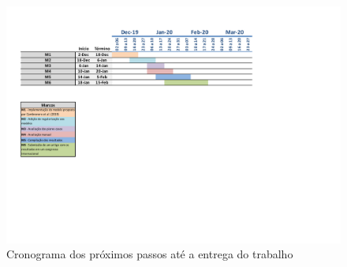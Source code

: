 \begin{figure}[h]
    \centering
    \includegraphics[width=1\textwidth]{figuras/cap-cronograma/cronograma_trabalho.pdf}
    \caption{Cronograma dos próximos passos até a entrega do trabalho}
    \label{fig:cronograma-proximos-passos-gantt-chart}
\end{figure}



